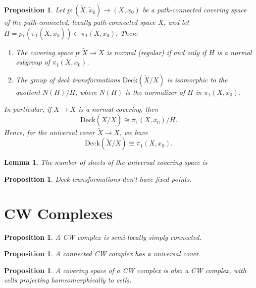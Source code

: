 \documentclass[a4paper]{article}
\theoremstyle{theorem}
\newtheorem{lemma}[theorem]{Lemma}
\newtheorem{proposition}[theorem]{Proposition}
\theoremstyle{definition}
\theoremstyle{remark}
\theoremstyle{gremark}
\theoremstyle{discussion}
\theoremstyle{notation}
\begin{document}
\begin{proposition}
	Let $p : (\widetilde{X}, \widetilde{x}_0) \to (X, x_0) $ be a path-connected covering space of the path-connected, locally path-connected space $X$, and let $H = p_* \left( \pi_1(\widetilde{X}, \widetilde{x}_0) \right) \subset \pi_1(X, x_0)$. Then:
	
	\begin{enumerate}
		\item The covering space \( p : \widetilde{X} \to X \) is normal (regular) if and only if \( H \) is a normal subgroup of \( \pi_1(X, x_0) \).
		
		\item The group of deck transformations \( \text{Deck}(\widetilde{X}/X) \) is isomorphic to the quotient \( N(H)/H \), where \( N(H) \) is the normalizer of \( H \) in \( \pi_1(X, x_0) \).
	\end{enumerate}
	
	\noindent In particular, if \( \widetilde{X} \to X \) is a normal covering, then
	\[
	\text{Deck}(\widetilde{X}/X) \cong \pi_1(X, x_0)/H.
	\]
	Hence, for the universal cover \( \widetilde{X} \to X \), we have
	\[
	\text{Deck}(\widetilde{X}/X) \cong \pi_1(X, x_0).
	\]
\end{proposition}

\begin{lemma}
	The number of sheets of the universal covering space is 
\end{lemma}

\begin{proposition}
	Deck transformations don't have fixed points.
\end{proposition}

\pagebreak

\section{CW Complexes}

\begin{proposition}
	A CW complex is semi-locally simply connected.
\end{proposition}

\begin{proposition}
	A connected CW complex has a universal cover.
\end{proposition}

\begin{proposition}
	A covering space of a CW complex is also a CW complex, with cells projecting homeomorphically to cells.
\end{proposition}
\end{document}
